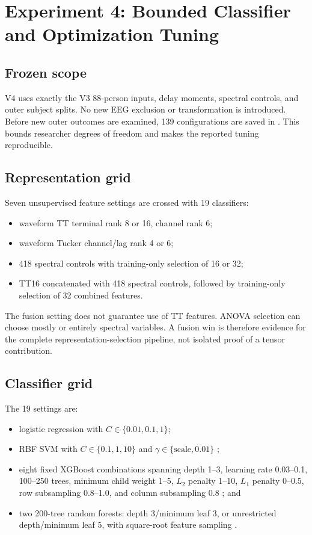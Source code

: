 \chapter{Experiment 4: Bounded Classifier and Optimization Tuning}
\label{ch:v4}

\section{Frozen scope}

V4 uses exactly the V3 88-person inputs, delay moments, spectral controls, and
outer subject splits. No new EEG exclusion or transformation is introduced.
Before new outer outcomes are examined, 139 configurations are saved in
. This bounds researcher degrees of freedom and makes the
reported tuning reproducible.

\section{Representation grid}

Seven unsupervised feature settings are crossed with 19 classifiers:

\begin{itemize}
  \item waveform TT terminal rank 8 or 16, channel rank 6;
  \item waveform Tucker channel/lag rank 4 or 6;
  \item 418 spectral controls with training-only selection of 16 or 32;
  \item TT16 concatenated with 418 spectral controls, followed by training-only
  selection of 32 combined features.
\end{itemize}

The fusion setting does not guarantee use of TT features. ANOVA selection can
choose mostly or entirely spectral variables. A fusion win is therefore evidence
for the complete representation-selection pipeline, not isolated proof of a
tensor contribution.

\section{Classifier grid}

The 19 settings are:

\begin{itemize}
  \item logistic regression with $C\in\{0.01,0.1,1\}$;
  \item RBF SVM with $C\in\{0.1,1,10\}$ and
  $\gamma\in\{\text{scale},0.01\}$ \citep{cortes1995svm};
  \item eight fixed XGBoost combinations spanning depth 1--3, learning rate
  0.03--0.1, 100--250 trees, minimum child weight 1--5, $L_2$ penalty 1--10,
  $L_1$ penalty 0--0.5, row subsampling 0.8--1.0, and column subsampling 0.8
  \citep{chen2016xgboost}; and
  \item two 200-tree random forests: depth 3/minimum leaf 3, or unrestricted
  depth/minimum leaf 5, with square-root feature sampling
  \citep{breiman2001rf}.
\end{itemize}

